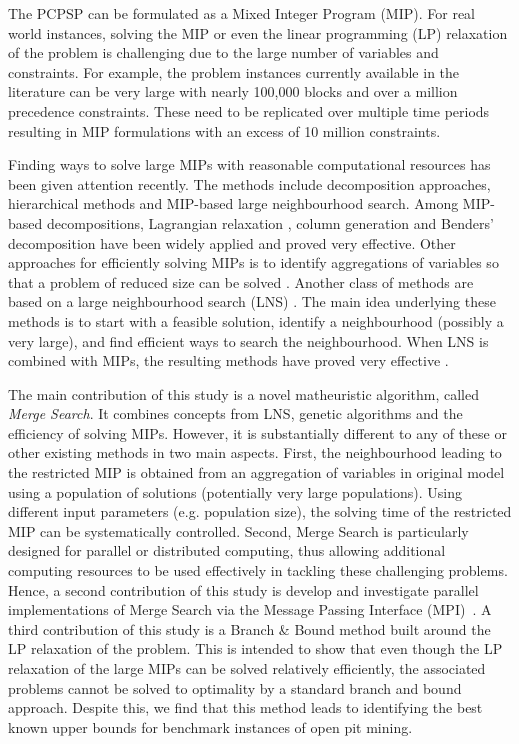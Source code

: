 \documentclass[authoryear,11pt,square,number,times,super,comma]{elsarticle}
\begin{document}
The PCPSP can be formulated as a Mixed Integer Program (MIP). For real world instances, solving the MIP or even the linear programming (LP) relaxation of the problem is challenging due to the 
large number of variables and constraints. For example, the problem instances currently available in the literature 
can be very large with nearly 100,000 blocks and over a million precedence constraints. These need to be replicated over multiple time periods resulting 
in MIP formulations with an excess of 10 million constraints. 
 
Finding ways to solve large MIPs with reasonable computational resources has been given attention recently. The methods include decomposition approaches, hierarchical methods and MIP-based large neighbourhood search. Among MIP-based decompositions, Lagrangian relaxation \citep{fisher04}, column generation \citep{Wolsey1998} and Benders' decomposition \citep{Geoffrion1972} have been widely applied and proved very effective. Other approaches for efficiently solving MIPs is to identify aggregations of variables so that a problem of reduced size can be solved \citep{BOLAND2009, Litvinchev:2003, Rogers:1991}. Another class of methods are based on a large neighbourhood search (LNS) \citep{Ahuja:2002}. The main idea underlying these methods is to start with a feasible solution, identify a neighbourhood (possibly a very large), and find efficient ways to search the neighbourhood. When LNS is combined with MIPs, the resulting methods have proved very effective \citep{Ahuja:2002,Pisinger2010}. 

The main contribution of this study is a novel matheuristic algorithm, called {\it Merge Search}. It combines concepts from LNS, genetic algorithms \citep{Mitchell:1996} and the efficiency of solving MIPs. However, it is substantially different to any of these or other existing methods in two main aspects. First, the neighbourhood leading to the restricted MIP is obtained from an aggregation of variables in original model using a population of solutions (potentially very large populations). Using different input parameters (e.g. population size), the solving time of the restricted MIP can be systematically controlled. Second, Merge Search is particularly designed for parallel or distributed computing, thus allowing additional computing resources to be used effectively in tackling these challenging problems. Hence, a second contribution of this study is develop and investigate parallel implementations of Merge Search via the Message Passing Interface (MPI)~\citep{Gropp:1994}. A third contribution of this study is a Branch \& Bound method built around the LP relaxation of the problem. This is intended to show that even though the LP relaxation of the large MIPs can be solved relatively efficiently, the associated problems cannot be solved to optimality by a standard branch and bound approach. Despite this, we find that this method leads to identifying the best known upper bounds for benchmark instances of open pit mining. 
\end{document}
